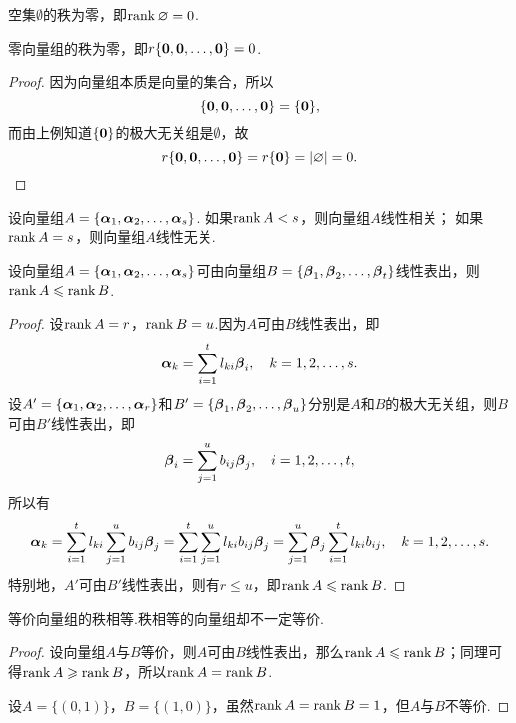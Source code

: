\begin{property}
空集\(\emptyset\)的秩为零，即\(\rank\varnothing = 0\).
\end{property}

\begin{property}
零向量组的秩为零，即\(r\{\boldsymbol{0},\boldsymbol{0},\dotsc,\boldsymbol{0}\}=0\).
\begin{proof}
因为向量组本质是向量的集合，所以\[
\{\boldsymbol{0},\boldsymbol{0},\dotsc,\boldsymbol{0}\} = \{\boldsymbol{0}\},
\]而由上例知道\(\{\boldsymbol{0}\}\)的极大无关组是\(\emptyset\)，故\[
r\{\boldsymbol{0},\boldsymbol{0},\dotsc,\boldsymbol{0}\}
= r\{\boldsymbol{0}\}
= \abs{\varnothing}
= 0.
\qedhere
\]
\end{proof}
\end{property}

\begin{corollary}
设向量组\(A=\{\boldsymbol{\alpha}_1,\boldsymbol{\alpha}_2,\dotsc,\boldsymbol{\alpha}_s\}\).
如果\(\rank{A}<s\)，则向量组\(A\)线性相关；
如果\(\rank{A}=s\)，则向量组\(A\)线性无关.
\end{corollary}

\begin{corollary}
\def\a#1{\mat{\alpha}_{#1}}
\def\b#1{\mat{\beta}_{#1}}
设向量组\(A=\{\a1,\a2,\dotsc,\a s\}\)可由向量组\(B=\{\b1,\b2,\dotsc,\b t\}\)线性表出，则\(\rank A \leqslant \rank B\).
\begin{proof}
设\(\rank A = r\)，\(\rank B = u\).因为\(A\)可由\(B\)线性表出，即\[
\a k = \sum\limits_{i=1}^t{l_{ki} \b i},
\quad k=1,2,\dotsc,s.
\]设\(A'=\{\a1,\a2,\dotsc,\a r\}\)和\(B'=\{\b1,\b2,\dotsc,\b u\}\)分别是\(A\)和\(B\)的极大无关组，则\(B\)可由\(B'\)线性表出，即\[
\b i = \sum\limits_{j=1}^u{b_{ij} \b j},
\quad i=1,2,\dotsc,t,
\]所以有\[
\a k = \sum\limits_{i=1}^t{l_{ki} \sum\limits_{j=1}^u{b_{ij} \b j}}
= \sum\limits_{i=1}^t{ \sum\limits_{j=1}^u{l_{ki} b_{ij} \b j} }
= \sum\limits_{j=1}^u{\b j \sum\limits_{i=1}^t{l_{ki} b_{ij}}},
\quad k=1,2,\dotsc,s.
\]特别地，\(A'\)可由\(B'\)线性表出，则有\(r \leqslant u\)，即\(\rank A \leqslant \rank B\).
\end{proof}
\end{corollary}

\begin{corollary}
等价向量组的秩相等.秩相等的向量组却不一定等价.
\begin{proof}
设向量组\(A\)与\(B\)等价，则\(A\)可由\(B\)线性表出，那么\(\rank A \leqslant \rank B\)；同理可得\(\rank A \geqslant \rank B\)，所以\(\rank A = \rank B\).

设\(A=\{ (0,1) \}\)，\(B=\{ (1,0) \}\)，虽然\(\rank A = \rank B = 1\)，但\(A\)与\(B\)不等价.
\end{proof}
\end{corollary}


